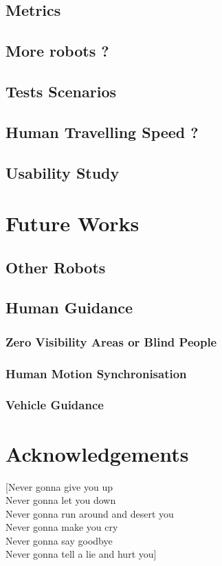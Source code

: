 \documentclass[a4paper, 12pt]{report}
\begin{document}
	\section{Metrics}
	\section{More robots ?}
	\section{Tests Scenarios}
	\section{Human Travelling Speed ?}
	\section{Usability Study}

\chapter{Future Works}
	\section{Other Robots}
	\section{Human Guidance}
		\subsection{Zero Visibility Areas or Blind People}
		\subsection{Human Motion Synchronisation}
		\subsection{Vehicle Guidance}

\chapter{Acknowledgements}

[Never gonna give you up\\
Never gonna let you down\\
Never gonna run around and desert you\\
Never gonna make you cry\\
Never gonna say goodbye\\
Never gonna tell a lie and hurt you]
\end{document}
